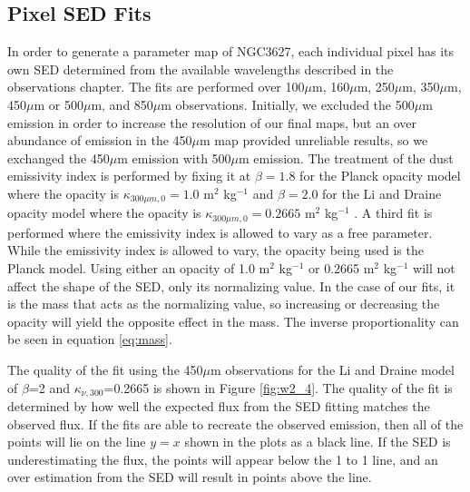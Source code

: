 \subsection{Pixel SED Fits}

In order to generate a parameter map of NGC3627, each individual pixel has its own SED determined from the available wavelengths described in the observations chapter.  The fits are performed over 100$\mu$m, 160$\mu$m, 250$\mu$m, 350$\mu$m, 450$\mu$m or 500$\mu$m, and 850$\mu$m observations.  Initially, we excluded the 500$\mu$m emission in order to increase the resolution of our final maps, but an over abundance of emission in the 450$\mu$m map provided unreliable results, so we exchanged the 450$\mu$m emission with 500$\mu$m emission.  The treatment of the dust emissivity index is performed by fixing it at $\beta=1.8$ for the Planck opacity model where the opacity is $\kappa_{300\mu m,0}=1.0$ m$^2$ kg$^{-1}$ \citep{planckxxv2011} and $\beta=2.0$ for the Li and Draine opacity model where the opacity is $\kappa_{300\mu m,0}=0.2665$ m$^2$ kg$^{-1}$ \citep{li2001}.  A third fit is performed where the emissivity index is allowed to vary as a free parameter.  While the emissivity index is allowed to vary, the opacity being used is the Planck model.  Using either an opacity of 1.0 m$^2$ kg$^{-1}$ or 0.2665 m$^2$ kg$^{-1}$ will not affect the shape of the SED, only its normalizing value.  In the case of our fits, it is the mass that acts as the normalizing value, so increasing or decreasing the opacity will yield the opposite effect in the mass.  The inverse proportionality can be seen in equation \ref{eq:mass}.  

The quality of the fit using the 450$\mu$m observations for the Li and Draine model of $\beta$=2 and $\kappa_{\nu,300}$=0.2665 is shown in Figure \ref{fig:w2_4}.  The quality of the fit is determined by how well the expected flux from the SED fitting matches the observed flux.  If the fits are able to recreate the observed emission, then all of the points will lie on the line $y=x$ shown in the plots as a black line.  If the SED is underestimating the flux, the points will appear below the 1 to 1 line, and an over estimation from the SED will result in points above the line.  

